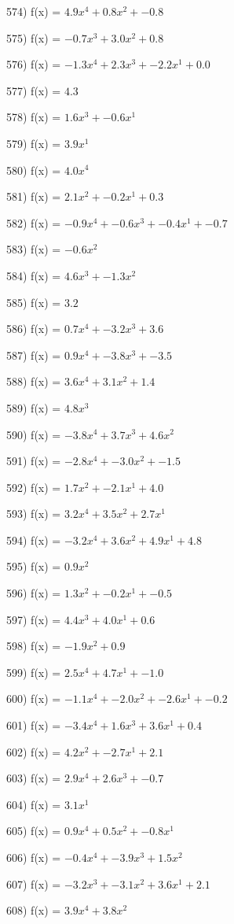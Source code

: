 \documentclass[10pt,a4paper]{article}
\begin{document}
574) f(x) = $4.9x^4 + 0.8x^2 + -0.8$

575) f(x) = $-0.7x^3 + 3.0x^2 + 0.8$

576) f(x) = $-1.3x^4 + 2.3x^3 + -2.2x^1 + 0.0$

577) f(x) = $4.3$

578) f(x) = $1.6x^3 + -0.6x^1$

579) f(x) = $3.9x^1$

580) f(x) = $4.0x^4$

581) f(x) = $2.1x^2 + -0.2x^1 + 0.3$

582) f(x) = $-0.9x^4 + -0.6x^3 + -0.4x^1 + -0.7$

583) f(x) = $-0.6x^2$

584) f(x) = $4.6x^3 + -1.3x^2$

585) f(x) = $3.2$

586) f(x) = $0.7x^4 + -3.2x^3 + 3.6$

587) f(x) = $0.9x^4 + -3.8x^3 + -3.5$

588) f(x) = $3.6x^4 + 3.1x^2 + 1.4$

589) f(x) = $4.8x^3$

590) f(x) = $-3.8x^4 + 3.7x^3 + 4.6x^2$

591) f(x) = $-2.8x^4 + -3.0x^2 + -1.5$

592) f(x) = $1.7x^2 + -2.1x^1 + 4.0$

593) f(x) = $3.2x^4 + 3.5x^2 + 2.7x^1$

594) f(x) = $-3.2x^4 + 3.6x^2 + 4.9x^1 + 4.8$

595) f(x) = $0.9x^2$

596) f(x) = $1.3x^2 + -0.2x^1 + -0.5$

597) f(x) = $4.4x^3 + 4.0x^1 + 0.6$

598) f(x) = $-1.9x^2 + 0.9$

599) f(x) = $2.5x^4 + 4.7x^1 + -1.0$

600) f(x) = $-1.1x^4 + -2.0x^2 + -2.6x^1 + -0.2$

601) f(x) = $-3.4x^4 + 1.6x^3 + 3.6x^1 + 0.4$

602) f(x) = $4.2x^2 + -2.7x^1 + 2.1$

603) f(x) = $2.9x^4 + 2.6x^3 + -0.7$

604) f(x) = $3.1x^1$

605) f(x) = $0.9x^4 + 0.5x^2 + -0.8x^1$

606) f(x) = $-0.4x^4 + -3.9x^3 + 1.5x^2$

607) f(x) = $-3.2x^3 + -3.1x^2 + 3.6x^1 + 2.1$

608) f(x) = $3.9x^4 + 3.8x^2$
\end{document}
